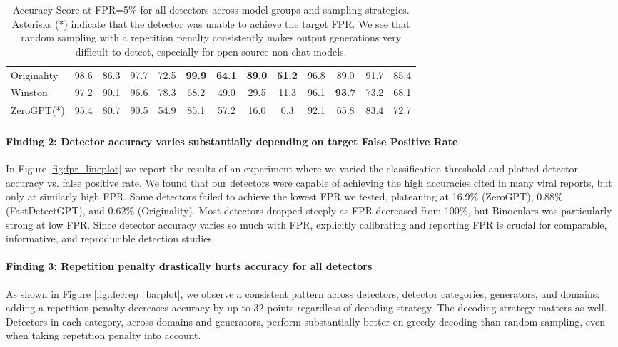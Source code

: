 \documentclass[11pt]{article}
\begin{document}
\begin{table}[t]
\begin{tabular}{l|c|c|c|c|c|c|c|c|c|c|c|c}
    Originality&98.6&86.3&97.7&72.5&\textbf{99.9}&\textbf{64.1}&\textbf{89.0}&\textbf{51.2}&96.8&89.0&91.7&85.4\\
    Winston&97.2&90.1&96.6&78.3&68.2&49.0&29.5&11.3&96.1&\textbf{93.7}&73.2&68.1\\
    ZeroGPT(*)&95.4&80.7&90.5&54.9&85.1&57.2&16.0&0.3&92.1&65.8&83.4&72.7\\
    \bottomrule
    \end{tabular}
    \caption{Accuracy Score at FPR=5\% for all detectors across model groups and sampling strategies. Asterisks (*) indicate that the detector was unable to achieve the target FPR. We see that random sampling with a repetition penalty consistently makes output generations very difficult to detect, especially for open-source non-chat models.}
    \label{tab:decoding_full_results}
\end{table}


\paragraph{Finding 2: Detector accuracy varies substantially depending on target False Positive Rate}
In Figure \ref{fig:fpr_lineplot} we report the results of an experiment where we varied the classification threshold and plotted detector accuracy vs. false positive rate. We found that our detectors were capable of achieving the high accuracies cited in many viral reports, but only at similarly high FPR. 
Some detectors failed to achieve the lowest FPR we tested, plateauing at 16.9\% (ZeroGPT), 0.88\% (FastDetectGPT), and 0.62\% (Originality). Most detectors dropped steeply as FPR decreased from 100\%, but Binoculars \citep{hans2024spotting} was particularly strong at low FPR. Since detector accuracy varies so much with FPR, explicitly calibrating and reporting FPR is crucial for comparable, informative, and reproducible detection studies.

\paragraph{Finding 3: Repetition penalty drastically hurts accuracy for all detectors}
As shown in Figure \ref{fig:decrep_barplot}, we observe a consistent pattern across detectors, detector categories, generators, and domains: adding a repetition penalty decreases accuracy by up to 32 points regardless of decoding strategy. The decoding strategy matters as well. Detectors in each category, across domains and generators, perform substantially better on greedy decoding than random sampling, even when taking repetition penalty into account.
\end{document}
